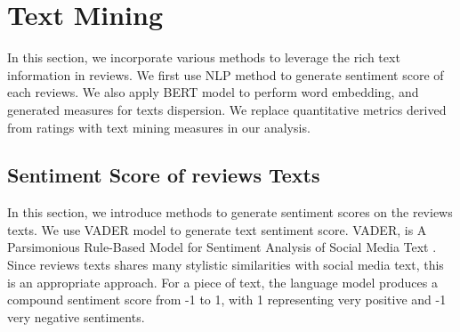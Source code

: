 \documentclass[msom,blindrev]{informs3}
\begin{document}
\section{Text Mining}
In this section, we incorporate various methods to leverage the rich text information in reviews.  We first use NLP method to generate sentiment score of each reviews. We also apply BERT model to perform word embedding, and generated measures for texts dispersion. We replace quantitative metrics derived from ratings with text mining measures in our analysis.

\subsection{Sentiment Score of reviews Texts}
In this section, we introduce methods to generate sentiment scores on the reviews texts. We use VADER model to generate text sentiment score. VADER, is A Parsimonious Rule-Based Model for Sentiment Analysis of Social Media Text \citep{hutto2014vader}. Since reviews texts shares many stylistic similarities with social media text, this is an appropriate approach. For a piece of text, the language model produces a compound sentiment score from -1 to 1, with 1 representing very positive and -1  very negative sentiments.


\end{document}
